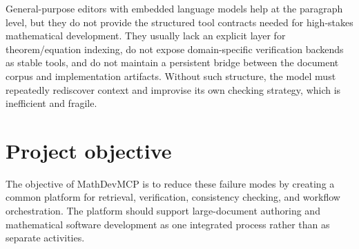 General-purpose editors with embedded language models help at the paragraph level, but they do not provide the structured tool contracts needed for high-stakes mathematical development. They usually lack an explicit layer for theorem/equation indexing, do not expose domain-specific verification backends as stable tools, and do not maintain a persistent bridge between the document corpus and implementation artifacts. Without such structure, the model must repeatedly rediscover context and improvise its own checking strategy, which is inefficient and fragile.

\section{Project objective}

The objective of MathDevMCP is to reduce these failure modes by creating a common platform for retrieval, verification, consistency checking, and workflow orchestration. The platform should support large-document authoring and mathematical software development as one integrated process rather than as separate activities.
